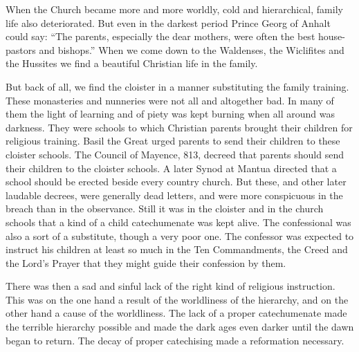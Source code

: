 When the Church became more and more worldly, cold and hierarchical, family life also deteriorated. But even in the darkest period Prince Georg of Anhalt could say: “The parents, especially the dear mothers, were often the best house-pastors and bishops.” When we come down to the Waldenses, the Wiclifites and the Hussites we find a beautiful Christian life in the family.

 But back of all, we find the cloister in a manner substituting the family training. These monasteries and nunneries were not all and altogether bad. In many of them the light of learning and of piety was kept burning when all around was darkness. They were schools to which Christian parents brought their children for religious training. Basil the Great urged parents to send their children to these cloister schools. The Council of Mayence, 813, decreed that parents should send their children to the cloister schools. A later Synod at Mantua directed that a
school should be erected beside every country church. But these, and other later laudable decrees, were generally dead letters, and were more conspicuous in the breach than in the observance. Still it was in the cloister and in the church schools that a kind of a child catechumenate was kept alive. The confessional was also a sort of a substitute, though a very poor one. The confessor was expected to instruct his children at least so much in the Ten Commandments, the Creed and the Lord’s Prayer that they might guide their confession by them.

 There was then a sad and sinful lack of the right kind of religious instruction. This was on the one hand a result of the worldliness of the hierarchy, and on the other hand a cause of the worldliness. The lack of a proper catechumenate made the terrible hierarchy possible and made the dark ages even darker until the dawn began to return. The decay of proper catechising made a reformation necessary.

